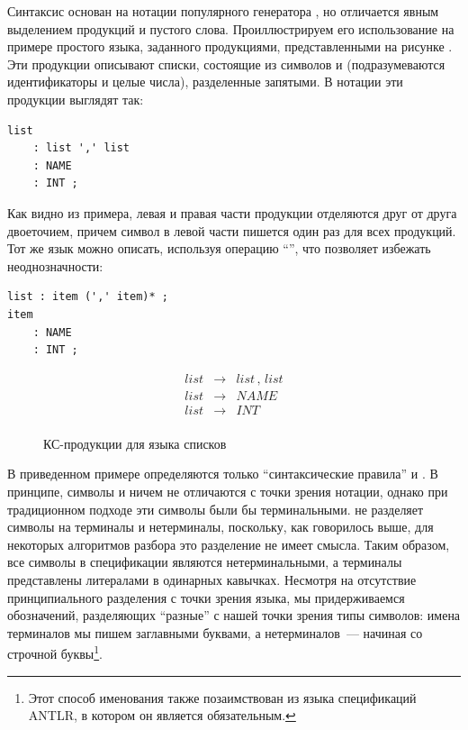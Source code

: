 Синтаксис  основан на нотации популярного генератора , но отличается явным выделением продукций и пустого слова. Проиллюстрируем его использование на примере простого языка, заданного продукциями, представленными на рисунке . Эти продукции описывают списки, состоящие из символов  и  (подразумеваются идентификаторы и целые числа), разделенные запятыми. В нотации \GRM{} эти продукции выглядят так:
\begin{lstlisting}
list 
	: list ',' list
	: NAME
	: INT ;
\end{lstlisting}
Как видно из примера, левая и правая части продукции отделяются друг от друга двоеточием, причем символ в левой части пишется один раз для всех продукций. Тот же язык можно описать, используя операцию ``\code{*}'', что позволяет избежать неоднозначности:
 \begin{lstlisting}
list : item (',' item)* ;
item
	: NAME
	: INT ;
\end{lstlisting}

\begin{figure}[bhtp]
\newcommand{\gp}[2]{#1 & \rightarrow & #2 \\}
$$
\begin{array}{rcl}
\gp{list}{list \, , \, list}
\gp{list}{\mathit{NAME}}
\gp{list}{\mathit{INT}}
\end{array}
$$
\caption{КС-продукции для языка списков}\label{ListProd}
\end{figure}

В приведенном примере определяются только ``синтаксические правила''  и . 
В принципе, символы  и  ничем не отличаются с точки зрения нотации, однако при традиционном подходе эти символы были бы терминальными. \GRM{} не разделяет символы на терминалы и нетерминалы, поскольку, как говорилось выше, для некоторых алгоритмов разбора это разделение не имеет смысла. Таким образом, все символы в спецификации являются нетерминальными, а терминалы представлены литералами в одинарных кавычках. Несмотря на отсутствие принципиального разделения с точки зрения языка, мы придерживаемся обозначений, разделяющих ``разные'' с нашей точки зрения типы символов: имена терминалов мы пишем заглавными буквами, а нетерминалов~--- начиная со строчной буквы\footnote{Этот способ именования также позаимствован из языка спецификаций ANTLR, в котором он является обязательным.}.

